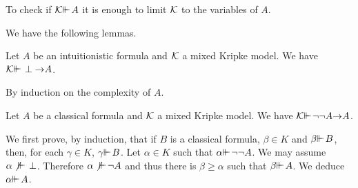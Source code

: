 \documentclass{jancl}
\begin{document}
\begin{remark} {To check if ${\cal K} {\ifmmode{ {\vdash}\mkern-7.6mu
{\vdash}\mkern2mu}\else{ {\vdash}\kern-.28em
{\vdash}\hskip1pt\ }\fi\relax} A$ it is enough to limit ${\cal K}$ to
the variables of $A$.}
\end{remark}

We have the following lemmas.
\begin{lemma} \label{kripkeint}
Let $A$ be an intuitionistic formula and ${\cal K}$ a  mixed Kripke
model. We have ${\cal K} {\ifmmode{ {\vdash}\mkern-7.6mu
{\vdash}\mkern2mu}\else{ {\vdash}\kern-.28em
{\vdash}\hskip1pt\ }\fi\relax} \perp {\rightarrow} A$.
\end{lemma}

\begin{proof*}
By induction on the complexity of $A$.
\end{proof*}

\begin{lemma}  \label{kripkecla}
Let $A$ be a classical formula and ${\cal K}$ a  mixed Kripke model.
We have ${\cal K} {\ifmmode{ {\vdash}\mkern-7.6mu
{\vdash}\mkern2mu}\else{ {\vdash}\kern-.28em
{\vdash}\hskip1pt\ }\fi\relax} {\neg} {\neg} A {\rightarrow} A$.
\end{lemma}

\begin{proof*}
We first prove, by induction, that if $B$ is a classical formula,
${\beta} \in K$ and ${\beta} {\ifmmode{ {\vdash}\mkern-7.6mu
{\vdash}\mkern2mu}\else{ {\vdash}\kern-.28em
{\vdash}\hskip1pt\ }\fi\relax} B$, then, for each ${\gamma} \in K$, ${\gamma}
{\ifmmode{ {\vdash}\mkern-7.6mu
{\vdash}\mkern2mu}\else{ {\vdash}\kern-.28em
{\vdash}\hskip1pt\ }\fi\relax} B$. Let ${\alpha} \in K$ such that ${\alpha} {\ifmmode{ {\vdash}\mkern-7.6mu
{\vdash}\mkern2mu}\else{ {\vdash}\kern-.28em
{\vdash}\hskip1pt\ }\fi\relax} {\neg} {\neg} A$.
We may assume ${\alpha} \not {\ifmmode{ {\vdash}\mkern-7.6mu
{\vdash}\mkern2mu}\else{ {\vdash}\kern-.28em
{\vdash}\hskip1pt\ }\fi\relax} \perp$. Therefore ${\alpha} \not
{\ifmmode{ {\vdash}\mkern-7.6mu
{\vdash}\mkern2mu}\else{ {\vdash}\kern-.28em
{\vdash}\hskip1pt\ }\fi\relax} {\neg} A$ and thus there is ${\beta} \geq {\alpha}$ such that ${\beta}
{\ifmmode{ {\vdash}\mkern-7.6mu
{\vdash}\mkern2mu}\else{ {\vdash}\kern-.28em
{\vdash}\hskip1pt\ }\fi\relax} A$. We deduce ${\alpha} {\ifmmode{ {\vdash}\mkern-7.6mu
{\vdash}\mkern2mu}\else{ {\vdash}\kern-.28em
{\vdash}\hskip1pt\ }\fi\relax} A$.
\end{proof*}
\end{document}
